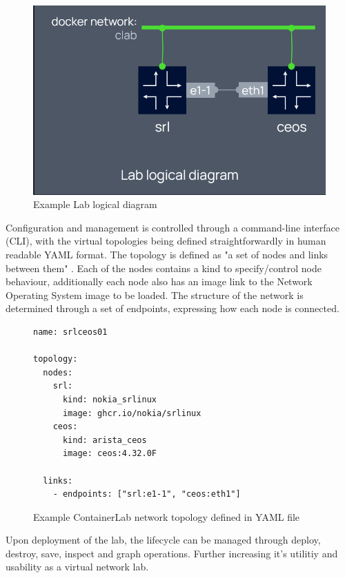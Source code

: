 \begin{figure}
    \centering
    \includegraphics[width=0.5\linewidth]{images/lab_logical_diagram.png}
    \caption{Example Lab logical diagram \cite{containerlab}}
    \label{fig:lab_diagram_example}
\end{figure}

Configuration and management is controlled through a command-line interface (CLI), with the virtual topologies being defined straightforwardly in human readable YAML format. The topology is defined as "a set of nodes and links between them" \cite{containerlab}. Each of the nodes contains a kind to specify/control node behaviour, additionally each node also has an image link to the Network Operating System image to be loaded. The structure of the network is determined through a set of endpoints, expressing how each node is connected.

\begin{figure}
    \centering
    \begin{lstlisting}
name: srlceos01

topology:
  nodes:
    srl:
      kind: nokia_srlinux
      image: ghcr.io/nokia/srlinux
    ceos:
      kind: arista_ceos
      image: ceos:4.32.0F

  links:
    - endpoints: ["srl:e1-1", "ceos:eth1"]
\end{lstlisting}
    \caption{Example ContainerLab network topology defined in YAML file}
    \label{fig:topology_yml}
\end{figure}

Upon deployment of the lab, the lifecycle can be managed through deploy, destroy, save, inspect and graph operations. Further increasing it's utilitiy and usability as a virtual network lab.


